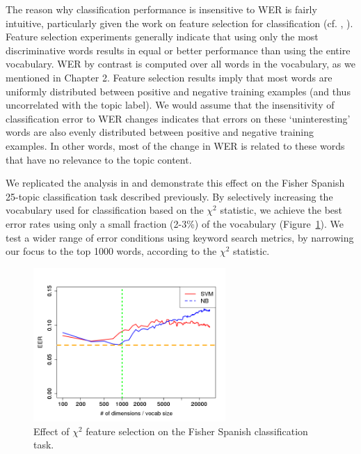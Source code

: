 The reason why classification performance is insensitive to WER is fairly intuitive, particularly given the work on feature selection for classification (cf. \cite{yang1997}, \cite{hazen2007}).  Feature selection experiments generally indicate that using only the most discriminative words results in equal or better performance than using the entire vocabulary.   WER by contrast is computed over all words in the vocabulary, as we mentioned in Chapter 2.  Feature selection results imply that most words are uniformly distributed between positive and negative training examples (and thus uncorrelated with the topic label).  We would assume that the insensitivity of classification error to WER changes indicates that errors on these `uninteresting' words are also evenly distributed between positive and negative training examples.  In other words, most of the change in WER is related to these words that have no relevance to the topic content.

We replicated the analysis in \cite{yang1997} and demonstrate this effect on the Fisher Spanish 25-topic classification task described previously.  By selectively increasing the vocabulary used for classification based on the $\chi^2$ statistic, we achieve the best error rates using only a small fraction (2-3\%) of the vocabulary (Figure~\ref{ch3Chi2}).  We test a wider range of error conditions using keyword search metrics, by narrowing our focus to the top 1000 words, according to the $\chi^2$ statistic.



\begin{figure}[t]
\centering
\includegraphics[width=0.65\textwidth]{graphs/ch3/chi2-poster.png}
\caption[Effect of feature selection on Fisher Spanish classification]{Effect of $\chi^2$ feature selection on the Fisher Spanish classification task.\label{ch3Chi2}}
\end{figure}

